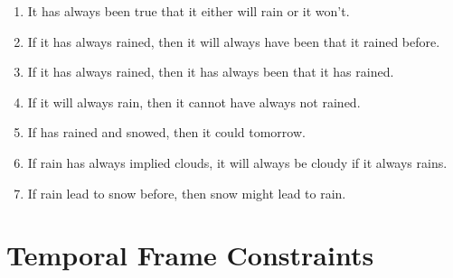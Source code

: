 \documentclass[a4paper, 11pt]{article}                  %
\begin{document}
\begin{enumerate}
    \item It has always been true that it either will rain or it won't.

    \item If it has always rained, then it will always have been that it rained before.

    \item If it has always rained, then it has always been that it has rained.

    \item If it will always rain, then it cannot have always not rained.

    \item If has rained and snowed, then it could tomorrow.

    \item If rain has always implied clouds, it will always be cloudy if it always rains.

    \item If rain lead to snow before, then snow might lead to rain.

\end{enumerate}





\section{Temporal Frame Constraints}
\end{document}
